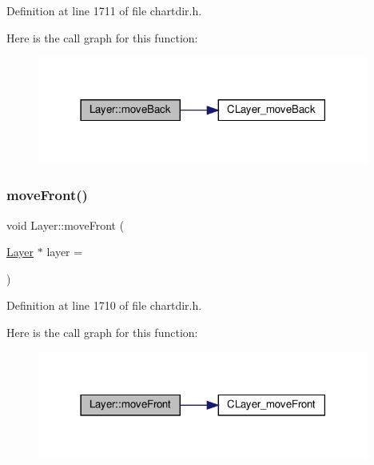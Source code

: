 Definition at line 1711 of file chartdir.\+h.

Here is the call graph for this function\+:
\nopagebreak
\begin{figure}[H]
\begin{center}
\leavevmode
\includegraphics[width=309pt]{class_layer_a20e9919153e863772cdbe88bcc8cf0ea_cgraph}
\end{center}
\end{figure}
\mbox{\label{class_layer_af6c5ffa1b6b50305dc0f64ed62ee97a3}} 
\subsubsection{\texorpdfstring{move\+Front()}{moveFront()}}
{\footnotesize\ttfamily void Layer\+::move\+Front (\begin{DoxyParamCaption}\item[{\hyperlink{class_layer}{Layer} $\ast$}]{layer = {} }\end{DoxyParamCaption})\hspace{0.3cm}{\ttfamily [inline]}}



Definition at line 1710 of file chartdir.\+h.

Here is the call graph for this function\+:
\nopagebreak
\begin{figure}[H]
\begin{center}
\leavevmode
\includegraphics[width=309pt]{class_layer_af6c5ffa1b6b50305dc0f64ed62ee97a3_cgraph}
\end{center}
\end{figure}
\mbox{\label{class_layer_abea35b3036cda42bbcb7f483004ebf8e}} 
